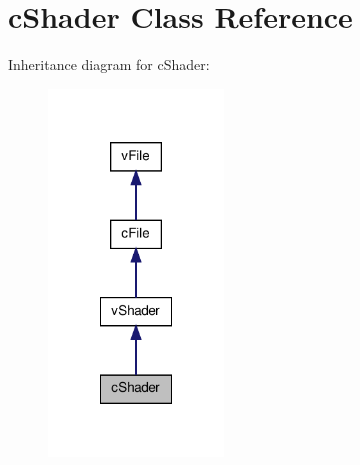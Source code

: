 \hypertarget{classc_shader}{
\section{cShader Class Reference}
\label{classc_shader}
}


Inheritance diagram for cShader:
\nopagebreak
\begin{figure}[H]
\begin{center}
\leavevmode
\includegraphics[width=132pt]{classc_shader__inherit__graph}
\end{center}
\end{figure}


